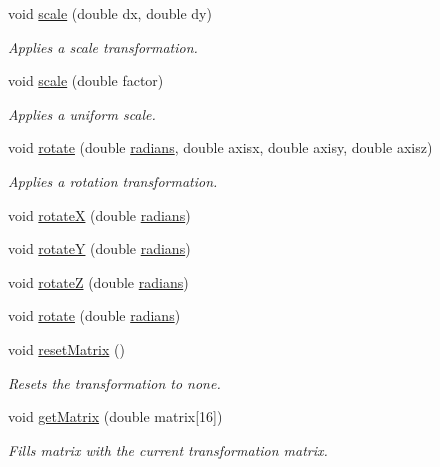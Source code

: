 \begin{DoxyCompactItemize}
void \hyperlink{namespacecprocessing_a9f393203e195c6843c3880c952432ec7}{scale} (double dx, double dy)
\begin{DoxyCompactList}\small\item\em \-Applies a scale transformation. \end{DoxyCompactList}\item 
void \hyperlink{namespacecprocessing_a987be2f2fbe7386914a94dac7343801e}{scale} (double factor)
\begin{DoxyCompactList}\small\item\em \-Applies a uniform scale. \end{DoxyCompactList}\item 
void \hyperlink{namespacecprocessing_afa46f333138777dcaa09eeff125a9d39}{rotate} (double \hyperlink{namespacecprocessing_a8e4f15390e12437ed626441da1cc767d}{radians}, double axisx, double axisy, double axisz)
\begin{DoxyCompactList}\small\item\em \-Applies a rotation transformation. \end{DoxyCompactList}\item 
void \hyperlink{namespacecprocessing_af0ade51f94b423933c31eafd92b96ab8}{rotate\-X} (double \hyperlink{namespacecprocessing_a8e4f15390e12437ed626441da1cc767d}{radians})
\item 
void \hyperlink{namespacecprocessing_ab42ccf131e68079e8333e209b5bbd70e}{rotate\-Y} (double \hyperlink{namespacecprocessing_a8e4f15390e12437ed626441da1cc767d}{radians})
\item 
void \hyperlink{namespacecprocessing_adb7051057100be20b837209c6a479fc6}{rotate\-Z} (double \hyperlink{namespacecprocessing_a8e4f15390e12437ed626441da1cc767d}{radians})
\item 
void \hyperlink{namespacecprocessing_a14fb0bc1e493f50d941da1f95cfaf227}{rotate} (double \hyperlink{namespacecprocessing_a8e4f15390e12437ed626441da1cc767d}{radians})
\item 
void \hyperlink{namespacecprocessing_af2d05683bc26cdc849748dbcc4fd9633}{reset\-Matrix} ()
\begin{DoxyCompactList}\small\item\em \-Resets the transformation to none. \end{DoxyCompactList}\item 
void \hyperlink{namespacecprocessing_a239beab716293400201d76c2b161bf94}{get\-Matrix} (double matrix\mbox{[}16\mbox{]})
\begin{DoxyCompactList}\small\item\em \-Fills matrix with the current transformation matrix. \end{DoxyCompactList}\item 

\end{DoxyCompactItemize}
